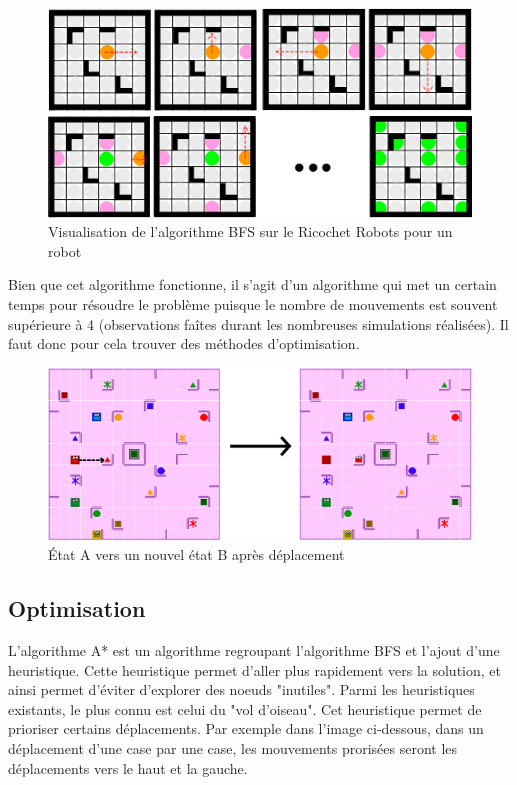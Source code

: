 \documentclass[a4paper, 12pt]{article}
\begin{document}
          \begin{figure}[H]
                \centering
                \includegraphics[scale=0.85]{images/bfsRicochet.png}
                \caption{Visualisation de l'algorithme BFS sur le Ricochet Robots pour un robot}
            \end{figure}
             
            
            Bien que cet algorithme fonctionne, il s'agit d'un algorithme qui met un certain temps pour résoudre le problème puisque le nombre de mouvements est souvent supérieure à 4 (observations faîtes durant les nombreuses simulations réalisées). Il faut donc pour cela trouver des méthodes d'optimisation.
       
            \begin{figure}[H]
                \centering
                \includegraphics[scale=0.75]{images/stateToState.png}
                \caption{État A vers un nouvel état B après déplacement}
            \end{figure}
    \subsection{Optimisation}
        L'algorithme A* est un algorithme regroupant l'algorithme BFS et l'ajout d'une heuristique. Cette heuristique permet d'aller plus rapidement vers la solution, et ainsi permet d'éviter d'explorer des noeuds "inutiles".
        Parmi les heuristiques existants, le plus connu est celui du "vol d'oiseau". Cet heuristique permet de prioriser certains déplacements. Par exemple dans l'image ci-dessous, dans un déplacement d'une case par une case, les mouvements prorisées seront les déplacements vers le haut et la gauche.
        
\end{document}
